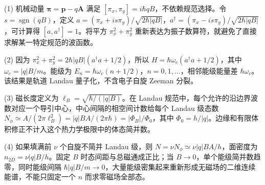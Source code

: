 (1) 机械动量 \(\boldsymbol\pi=\mathbf p-q\mathbf A\) 满足 \([\pi_x,\pi_y]=i\hbar qB\)，不依赖规范选择。令 \(s=\operatorname{sgn}(qB)\)，定义 \(a=(\pi_x+i s\pi_y)/\sqrt{2\hbar|qB|}\)，\(a^\dagger=(\pi_x-i s\pi_y)/\sqrt{2\hbar|qB|}\)，可计算得 \([a,a^\dagger]=1\)。将平方 \(\pi_x^2+\pi_y^2\) 重新表达为振子数算符，就避免了直接求解某一特定规范的波函数。

(2) 因为 \(\pi_x^2+\pi_y^2=2\hbar|qB|(a^\dagger a+1/2)\)，所以 \(H=\hbar\omega_c(a^\dagger a+1/2)\)，其中 \(\omega_c=|q|B/m\)。能级为 \(E_n=\hbar\omega_c(n+1/2)\)，\(n=0,1,\ldots\)，相邻能级能量差 \(\hbar\omega_c\)。该结果是轨道 Landau 量子化，不含电子自旋 Zeeman 分裂。

(3) 磁长度定义为 \(\ell_B=\sqrt{\hbar/(|q|B)}\)。在 Landau 规范中，每个允许的沿边界波数对应一个导引中心，中心间隔的相空间计数给每个 Landau 级态数 \(N_\phi\simeq A/(2\pi\ell_B^2)=|q|BA/(2\pi\hbar)=|\Phi_B|/\Phi_0\)，其中 \(\Phi_0=h/|q|\)。边缘和有限体积修正不计入这个热力学极限中的体态简并数。

(4) 如果填满前 \(\nu\) 个自旋不简并 Landau 级，则 \(N=\nu N_\phi\simeq\nu |q|BA/h\)，面密度为 \(n_{2D}=\nu|q|B/h\)。固定 \(B\) 时态间距与总磁通成正比；当 \(B\to0\)，单个能级简并数趋零，同时能级间隔 \(\hbar|q|B/m\to0\)，大量能级密集起来重新形成无磁场的二维连续能谱，不能只固定一个 \(n\) 而求零磁场全部态。
